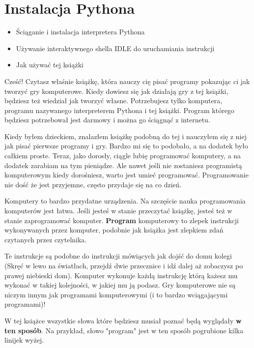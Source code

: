 \documentclass{book}
\newcommand{\btopicscovered}{
	\begin{graybox}
	\begin{itemize}
}
\newcommand{\etopicscovered}{
	\end{itemize}
	\end{graybox}
}
\begin{document}
\chapter{Instalacja Pythona}
\btopicscovered
	\item Ściąganie i instalacja interpretera Pythona
	\item Używanie interaktywnego shella IDLE do uruchamiania instrukcji
	\item Jak używać tej książki
\etopicscovered



Cześć! Czytasz właśnie książkę, która nauczy cię pisać programy pokazując ci jak tworzyć gry komputerowe. Kiedy dowiesz się jak działają gry z tej książki, będziesz też wiedział jak tworzyć własne. Potrzebujesz tylko komputera, programu nazywanego interpreterem Pythona i tej książki. Program którego będziesz potrzebował jest darmowy i można go ściągnąć z internetu.

Kiedy byłem dzieckiem, znalazłem książkę podobną do tej i nauczyłem się z niej jak pisać pierwsze programy i gry. Bardzo mi się to podobało, a na dodatek było całkiem proste. Teraz, jako dorosły, ciągle lubię programować komputery, a na dodatek zarabiam na tym pieniądze. Ale nawet jeśli nie zostaniesz programistą komputerowym kiedy dorośniesz, warto jest umieć programować. Programowanie nie dość że jest przyjemne, często przydaje się na co dzień.

Komputery to bardzo przydatne urządzenia. Na szczęście nauka programowania komputerów jest łatwa. Jeśli jesteś w stanie przeczytać książkę, jesteś też w stanie zaprogramować komputer. {\bf Program} komputerowy to zlepek instrukcji wykonywanych przez komputer, podobnie jak książka jest zlepkiem zdań czytanych przez czytelnika.

Te instrukcje są podobne do instrukcji mówiących jak dojść do domu kolegi (Skręć w lewo na światłach, przejdź dwie przecznice i idź dalej aż zobaczysz po prawej niebieski dom). Komputer wykonuje każdą instrukcję którą każesz mu wykonać w takiej kolejności, w jakiej mu ją podasz. Gry komputerowe nie są niczym innym jak programami komputerowymi (i to bardzo wciągającymi programami)!

W tej książce wszystkie słowa które będziesz musiał poznać będą wyglądały {\bf w ten sposób}. Na przykład, słowo "program" jest w ten sposób pogrubione kilka linijek wyżej.
\end{document}
